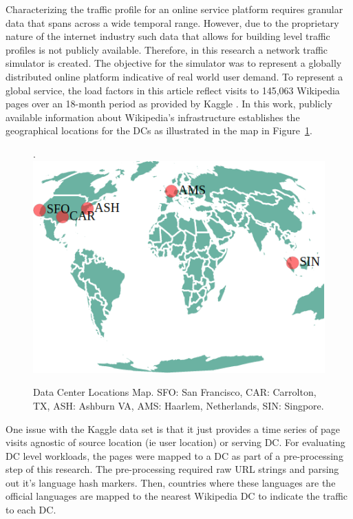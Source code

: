  Characterizing the traffic profile for an online service platform requires granular data that spans across a wide temporal range. However, due to the proprietary nature of the internet industry such data that allows for building level traffic profiles is not publicly available. Therefore, in this research a network traffic simulator is created. The objective for the simulator was to represent a globally distributed online platform indicative of real world user demand. To represent a global service, the load factors in this article reflect visits to 145,063 Wikipedia pages over an 18-month period as provided by Kaggle \citep{kaggle17}. In this work, publicly available information about Wikipedia's infrastructure establishes the geographical locations for the DCs as illustrated in the map in Figure~\ref{fig:dc_map}.

\begin{figure}[!h].
\centering
\includegraphics[scale=0.45]{building_energy_model/img/dc_locations.png}
\caption[DC Locations]{Data Center Locations Map. SFO: San Francisco, CAR: Carrolton, TX, ASH: Ashburn VA, AMS: Haarlem, Netherlands, SIN: Singpore.}
\label{fig:dc_map}
\end{figure}

One issue with the Kaggle data set is that it just provides a time series of page visits agnostic of source location (ie user location) or serving DC. For evaluating DC level workloads, the pages were mapped to a DC  as part of a pre-processing step of this research. The pre-processing required  raw URL strings and parsing out it's language hash markers. Then, countries where these languages are the official languages are mapped to the nearest Wikipedia DC to indicate the traffic to each DC. 

